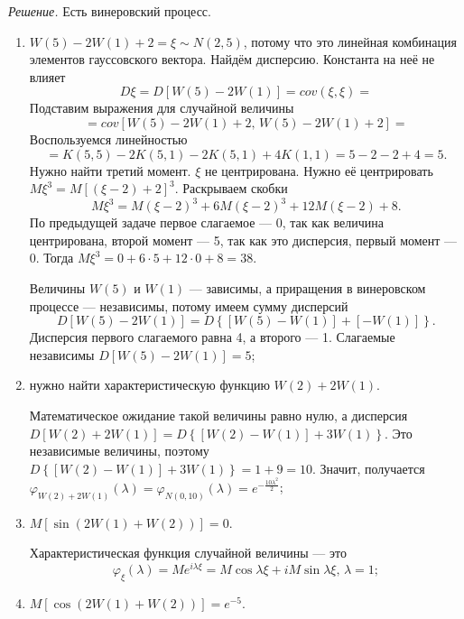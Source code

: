 \textit{Решение.}
Есть винеровский процесс.
\begin{enumerate}[label=\alph*)]
  \item $W \left( 5 \right) - 2W \left( 1 \right) + 2 = \xi \sim N \left( 2, 5 \right) $,
  потому что это линейная комбинация элементов гауссовского вектора.
  Найдём дисперсию.
  Константа на неё не влияет
  $$D \xi =
    D \left[ W \left( 5 \right) - 2W \left( 1 \right) \right] =
    cov \left( \xi, \xi \right) =$$
  Подставим выражения для случайной величины
  $$= cov \left[ W \left( 5 \right) - 2W \left( 1 \right) + 2, \,
      W \left( 5 \right) - 2W \left( 1 \right) + 2 \right] =$$
  Воспользуемся линейностью
  $$= K \left( 5, 5 \right) - 2K \left( 5, 1 \right) - 2K \left( 5, 1 \right) +
    4K \left( 1, 1 \right) =
    5 - 2 - 2 + 4 =
    5.$$
  Нужно найти третий момент.
  $ \xi $ не центрирована.
  Нужно её центрировать $M \xi^3 = M \left[ \left( \xi - 2 \right) + 2 \right]^3 $.
  Раскрываем скобки
  $$M \xi^3 =
    M \left( \xi - 2 \right)^3 + 6M \left( \xi - 2 \right)^3 + 12M \left( \xi - 2 \right) + 8.$$
  По предыдущей задаче первое слагаемое --- 0, так как величина центрирована, второй момент --- 5,
  так как это дисперсия, первый момент --- 0.
  Тогда $M \xi^3 = 0 + 6 \cdot 5 + 12 \cdot 0 + 8 = 38$.

  Величины $W \left( 5 \right) $ и $W \left( 1 \right) $ --- зависимы,
  а приращения в винеровском процессе --- независимы, потому имеем сумму дисперсий
  $$D \left[ W \left( 5 \right) - 2W \left( 1 \right) \right] =
    D \left\{
      \left[ W \left( 5 \right) - W \left( 1 \right) \right] + \left[ -W \left( 1 \right) \right]
    \right\}.$$
  Дисперсия первого слагаемого равна 4, а второго --- 1.
  Слагаемые независимы $D \left[ W \left( 5 \right) - 2W \left( 1 \right) \right] = 5$;
  \item нужно найти характеристическую функцию $W \left( 2 \right) + 2W \left( 1 \right) $.

  Математическое ожидание такой величины равно нулю, а дисперсия
  $D \left[ W \left( 2 \right) + 2W \left( 1 \right) \right] =
    D \left\{
      \left[ W \left( 2 \right) - W \left( 1 \right) \right] + 3W \left( 1 \right)
    \right\}$.
  Это независимые величины, поэтому
  $D \left\{
      \left[ W \left( 2 \right) - W \left( 1 \right) \right] + 3W \left( 1 \right)
    \right\} =
    1 + 9 = 10$.
  Значит, получается
  $ \varphi_{W \left( 2 \right) + 2W \left( 1 \right) } \left( \lambda \right) =
    \varphi_{N \left( 0, 10 \right) } \left( \lambda \right) =
    e^{-\frac{10 \lambda^2}{2}}$;
  \item $M \left[ \sin \left( 2W \left( 1 \right) + W \left( 2 \right) \right) \right] = 0$.

  Характеристическая функция случайной величины --- это
  $$ \varphi_{ \xi } \left( \lambda \right) = Me^{i \lambda \xi } =
    M \cos \lambda \xi + iM \sin \lambda \xi, \,
    \lambda = 1;$$
  \item $M \left[ \cos \left( 2W \left( 1 \right) + W \left( 2 \right) \right) \right] = e^{-5}$.
\end{enumerate}

